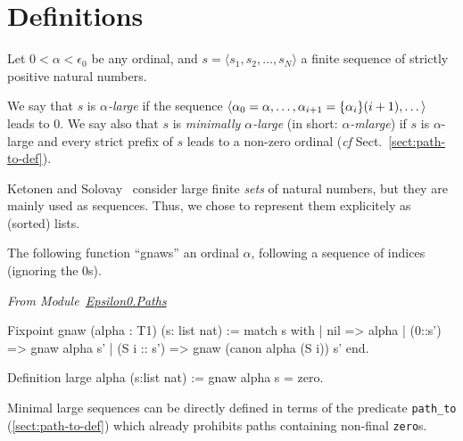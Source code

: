 \section{Definitions}


\begin{definition}
Let $0<\alpha<\epsilon_0$ be any ordinal, and $s=\langle s_1, s_2, \dots, s_N\rangle$ a finite sequence of strictly positive natural numbers. 

We say that $s$ is \emph{$\alpha$-large} if the sequence $\langle \alpha_0=\alpha,\dots,\alpha_{i+1}=\mbox{$\{\alpha_i\}(i+1)$},\dots \rangle$ leads to $0$. 
We say also that $s$ is \emph{minimally $\alpha$-large} (in short:
\emph{$\alpha$-mlarge}) if $s$ is $\alpha$-large 
 and every strict prefix of $s$ leads to a non-zero ordinal (\emph{cf} Sect.~\vref{sect:path-to-def}).


\end{definition}



\begin{remark}
  Ketonen and Solovay~\cite{KS81} consider  large finite \emph{sets} of natural numbers,  but they are mainly used as sequences. Thus, we chose to represent them explicitely as (sorted) lists. 
\end{remark}


The following function ``gnaws'' an ordinal $\alpha$, following a sequence of indices (ignoring the $0$s).

\vspace{4pt}

\noindent
\emph{From Module~\href{../theories/html/hydras.Epsilon0.Paths.html\#gnaw}{Epsilon0.Paths}}

\begin{Coqsrc}
Fixpoint gnaw (alpha : T1) (s: list nat) :=
  match s with
    | nil => alpha
    | (0::s') => gnaw  alpha s'
    | (S i :: s')  =>  gnaw (canon alpha (S i)) s'
  end.

Definition large alpha (s:list nat) := gnaw alpha s = zero.
\end{Coqsrc}


Minimal large sequences can be directly defined in terms of the
predicate \texttt{path\_to} (\vref{sect:path-to-def}) which already prohibits paths containing non-final \texttt{zero}s.

